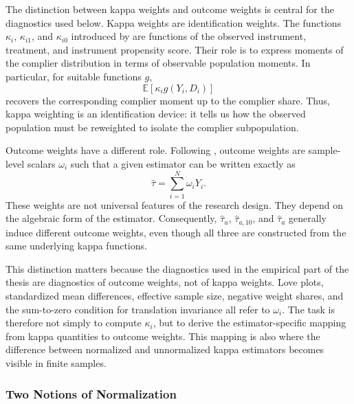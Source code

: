 \documentclass[12pt, a4paper, oneside]{article}
\theoremstyle{plain}
\theoremstyle{definition}
\begin{document}
The distinction between kappa weights and outcome weights is central for the
diagnostics used below. Kappa weights are identification weights. The functions
$\kappa_i$, $\kappa_{i1}$, and $\kappa_{i0}$ introduced by
\citet{abadie2003semiparametric} are functions of the observed instrument, treatment,
and instrument propensity score. Their role is to express moments of the complier
distribution in terms of observable population moments. In particular, for suitable
functions $g$,
\[
  \mathbb{E}\!\left[\kappa_i g(Y_i,D_i)\right]
\]
recovers the corresponding complier moment up to the complier share. Thus, kappa
weighting is an identification device: it tells us how the observed population must
be reweighted to isolate the complier subpopulation.

Outcome weights have a different role. Following \citet{knaus2024treatment},
outcome weights are sample-level scalars $\omega_i$ such that a given estimator can
be written exactly as
\[
  \hat\tau = \sum_{i=1}^N \omega_i Y_i .
\]
These weights are not universal features of the research design. They depend on the
algebraic form of the estimator. Consequently, $\hat\tau_u$, $\hat\tau_{a,10}$, and
$\hat\tau_a$ generally induce different outcome weights, even though all three are
constructed from the same underlying kappa functions.

This distinction matters because the diagnostics used in the empirical part of the
thesis are diagnostics of outcome weights, not of kappa weights. Love plots,
standardized mean differences, effective sample size, negative weight shares, and
the sum-to-zero condition for translation invariance all refer to $\omega_i$. The
task is therefore not simply to compute $\kappa_i$, but to derive the
estimator-specific mapping from kappa quantities to outcome weights. This mapping is
also where the difference between normalized and unnormalized kappa estimators
becomes visible in finite samples.

\subsubsection{Two Notions of Normalization}
\label{sssec:two_norms}
\end{document}
